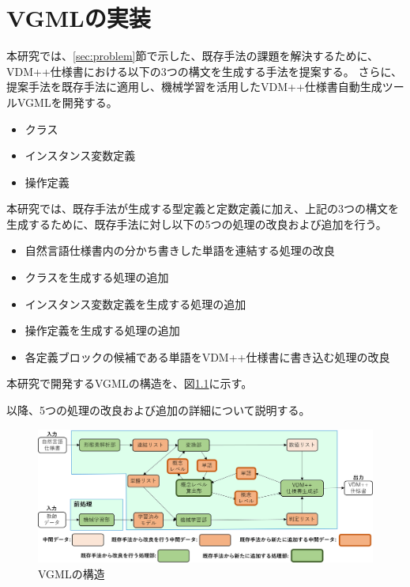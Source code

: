 \chapter{VGMLの実装}\label{cha:Implementation}

本研究では、\ref{sec:problem}節で示した、既存手法の課題を解決するために、VDM++仕様書における以下の3つの構文を生成する手法を提案する。
さらに、提案手法を既存手法に適用し、機械学習を活用したVDM++仕様書自動生成ツールVGMLを開発する。

\begin{itemize}
    \item クラス
    \item インスタンス変数定義
    \item 操作定義
\end{itemize}

本研究では、既存手法が生成する型定義と定数定義に加え、上記の3つの構文を生成するために、既存手法に対し以下の5つの処理の改良および追加を行う。

\begin{itemize}
    \item 自然言語仕様書内の分かち書きした単語を連結する処理の改良
    \item クラスを生成する処理の追加
    \item インスタンス変数定義を生成する処理の追加
    \item 操作定義を生成する処理の追加
    \item 各定義ブロックの候補である単語をVDM++仕様書に書き込む処理の改良
\end{itemize}

本研究で開発するVGMLの構造を、図\ref{fig:vgml_structure}に示す。

以降、5つの処理の改良および追加の詳細について説明する。

\begin{figure}[t]
    \begin{center}
        \includegraphics[width=1.0\columnwidth]{image/vgml_structure.png}
        \caption{VGMLの構造}
        \label{fig:vgml_structure}
    \end{center}
\end{figure}


